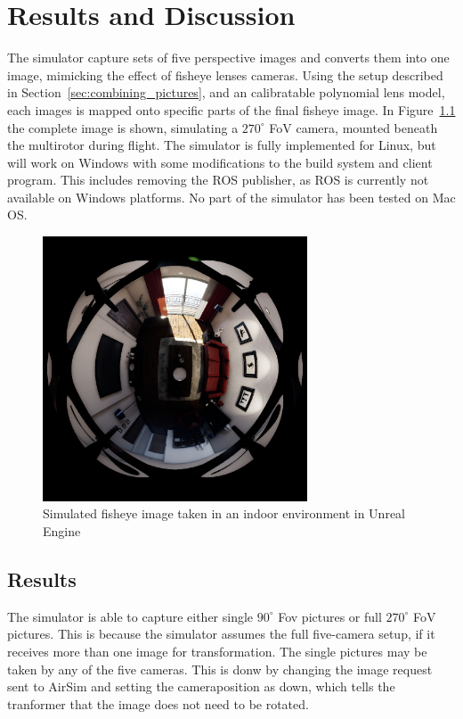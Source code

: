 
\chapter{Results and Discussion}

The simulator capture sets of five perspective images and converts them into one image, mimicking the effect of fisheye lenses cameras. Using the setup described in Section~\ref{sec:combining_pictures}, and an calibratable polynomial lens model, each images is mapped onto specific parts of the final fisheye image. In Figure~\ref{fig:res_show_fisheye} the complete image is shown, simulating a $270^\circ$ FoV camera, mounted beneath the multirotor during flight. The simulator is fully implemented for Linux, but will work on Windows with some modifications to the build system and client program. This includes removing the ROS publisher, as ROS is currently not available on Windows platforms. No part of the simulator has been tested on Mac OS. 

\begin{figure}[!htb]
    \centering
    \includegraphics[width=0.7\textwidth]{rapport/fig/Results/1024to1024.jpeg}
    \caption{Simulated fisheye image taken in an indoor environment in Unreal Engine}
    \label{fig:res_show_fisheye}
\end{figure}

\section{Results}

The simulator is able to capture either single $90^\circ$ Fov pictures or full $270^\circ$ FoV pictures. This is because the simulator assumes the full five-camera setup, if it receives more than one image for transformation. The single pictures may be taken by any of the five cameras. This is donw by changing the image request sent to AirSim and setting the cameraposition as down, which tells the tranformer that the image does not need to be rotated.

